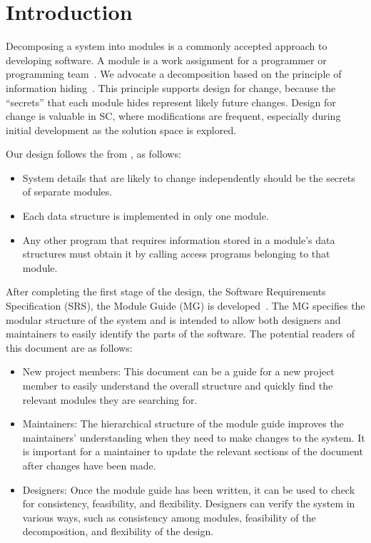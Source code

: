 \documentclass[12pt, titlepage]{article}
\begin{document}
\newpage

\tableofcontents

\listoftables

\listoffigures

\newpage


\section{Introduction}

Decomposing a system into modules is a commonly accepted approach to developing software.  A module
is a work assignment for a programmer or programming team~\citep{ParnasEtAl1984}.  We advocate a
decomposition based on the principle of information hiding~\citep{Parnas1972a}.  This principle
supports design for change, because the ``secrets'' that each module hides represent likely future
changes.  Design for change is valuable in SC, where modifications are frequent, especially during
initial development as the solution space is explored.

Our design follows the from \citet{ParnasEtAl1984}, as follows:
\begin{itemize}
\item System details that are likely to change independently should be the secrets of separate
  modules.
\item Each data structure is implemented in only one module.
\item Any other program that requires information stored in a module's data structures must obtain
  it by calling access programs belonging to that module.
\end{itemize}

After completing the first stage of the design, the Software Requirements Specification (SRS), the
Module Guide (MG) is developed~\citep{ParnasEtAl1984}. The MG specifies the modular structure of the
system and is intended to allow both designers and maintainers to easily identify the parts of the
software.  The potential readers of this document are as follows:

\begin{itemize}
\item New project members: This document can be a guide for a new project member to easily
  understand the overall structure and quickly find the relevant modules they are searching for.
\item Maintainers: The hierarchical structure of the module guide improves the maintainers'
  understanding when they need to make changes to the system. It is important for a maintainer to
  update the relevant sections of the document after changes have been made.
\item Designers: Once the module guide has been written, it can be used to check for consistency,
  feasibility, and flexibility. Designers can verify the system in various ways, such as consistency
  among modules, feasibility of the decomposition, and flexibility of the design.
\end{itemize}
\end{document}

